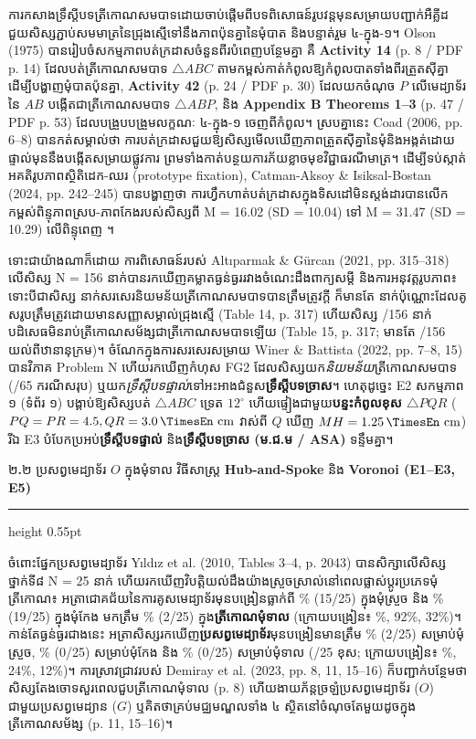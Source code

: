 \documentclass[a4paper,12pt]{article}
\newcommand{\en}[1]{{\TimesEn #1}}
\newcommand{\enbf}[1]{{\TimesEn\textbf{#1}}}
\newcommand{\unit}[1]{\,\text{\en{#1}}}
\newcommand{\tri}[1]{\ensuremath{\triangle #1}}
\newcommand{\subsectitle}[1]{{\muol\fontsize{11pt}{14.5pt}\selectfont #1}}
\newcommand{\subsec}[1]{%
  \Needspace{1.6cm}%
  \vspace{3pt}%
  \subsectitle{#1}\par%
  \vspace{-2pt}%
  {\color{black}\hrule height 0.55pt}%
  \vspace{3pt}%
}
\begin{document}
ការកសាងទ្រឹស្ដីបទត្រីកោណសមបាទដោយចាប់ផ្ដើមពីបទពិសោធន៍រូបវន្តមុនសម្រាយបញ្ជាក់អឺគ្លីដ ជួយសិស្សភ្ជាប់សមមាត្រនៃជ្រុងស្មើទៅនឹងភាពប៉ុនគ្នានៃមុំបាត និងបន្ទាត់រួម ៤-ក្នុង-១។ \en{Olson (1975)} បានរៀបចំសកម្មភាពបត់ក្រដាសចំនួនពីរបំពេញបន្ថែមគ្នា គឺ \textbf{\en{Activity 14}} (\en{p. 8 / PDF p. 14}) ដែលបត់ត្រីកោណសមបាទ $\tri{ABC}$ តាមកម្ពស់កាត់កំពូលឱ្យកំពូលបាតទាំងពីរត្រួតស៊ីគ្នាដើម្បីបង្ហាញមុំបាតប៉ុនគ្នា, \textbf{\en{Activity 42}} (\en{p. 24 / PDF p. 30}) ដែលយកចំណុច $P$ លើមេដ្យាទ័រនៃ $AB$ បង្កើតជាត្រីកោណសមបាទ $\tri{ABP}$, និង \textbf{\en{Appendix B Theorems 1--3}} (\en{p. 47 / PDF p. 53}) ដែលបង្រួបបង្រួមលក្ខណៈ ៤-ក្នុង-១ ចេញពីកំពូល។ ស្របគ្នានេះ \en{Coad (2006, pp. 6--8)} បានកត់សម្គាល់ថា ការបត់ក្រដាសជួយឱ្យសិស្សមើលឃើញភាពត្រួតស៊ីគ្នានៃមុំនិងអង្កត់ដោយផ្ទាល់មុននឹងបង្កើតសម្រាយផ្លូវការ ព្រមទាំងកាត់បន្ថយការភ័យខ្លាចមុខវិជ្ជាធរណីមាត្រ។ ដើម្បីទប់ស្កាត់អគតិរូបភាពស្ថិតិដេក-ឈរ (\en{prototype fixation}), \en{Catman-Aksoy \& Isiksal-Bostan (2024, pp. 242--245)} បានបង្ហាញថា ការហ្វឹកហាត់បត់ក្រដាសក្នុងទិសដៅមិនស្ដង់ដារបានលើកកម្ពស់ពិន្ទុភាពស្រប-ភាពកែងរបស់សិស្សពី \en{M = 16.02 (SD = 10.04)} ទៅ \en{M = 31.47 (SD = 10.29)} លើពិន្ទុពេញ \en{54}។

ទោះជាយ៉ាងណាក៏ដោយ ការពិសោធន៍របស់ \en{Altıparmak \& Gürcan (2021, pp. 315--318)} លើសិស្ស \en{N = 156} នាក់បានរកឃើញគម្លាតធ្ងន់ធ្ងររវាងចំណេះដឹងពាក្យសម្ដី និងការអនុវត្តរូបភាព៖ ទោះបីជាសិស្ស \en{56} នាក់សរសេរនិយមន័យត្រីកោណសមបាទបានត្រឹមត្រូវក្ដី ក៏មានតែ \en{23} នាក់ប៉ុណ្ណោះដែលគូសរូបត្រឹមត្រូវដោយមានសញ្ញាសម្គាល់ជ្រុងស្មើ (\en{Table 14, p. 317}) ហើយសិស្ស \en{151/156} នាក់បដិសេធមិនរាប់ត្រីកោណសម័ង្សជាត្រីកោណសមបាទឡើយ (\en{Table 15, p. 317}; មានតែ \en{5/156} យល់ពីឋានានុក្រម)។ ចំណែកក្នុងការសរសេរសម្រាយ \en{Winer \& Battista (2022, pp. 7--8, 15)} បានវិភាគ \en{Problem N} ហើយរកឃើញកំហុស \en{FG2} ដែលសិស្សយក\emph{និយមន័យ}ត្រីកោណសមបាទ (\en{27/65} ករណីសរុប) ឬយក\emph{ទ្រឹស្ដីបទផ្ទាល់}ទៅអះអាងជំនួស\textbf{ទ្រឹស្ដីបទច្រាស}។ ហេតុដូច្នេះ \en{E2} សកម្មភាព ១ (ទំព័រ ១) បង្គាប់ឱ្យសិស្សបត់ $\tri{ABC}$ ទ្រេត $12^\circ$ ហើយផ្ទៀងជាមួយ\textbf{បន្ទះកំពូលខុស $\tri{PQR}$} ($PQ=PR=4.5, QR=3.0\unit{cm}$ វាស់ពី $Q$ ឃើញ $MH=1.25\unit{cm}$) រីឯ \en{E3} បំបែកប្រអប់\textbf{ទ្រឹស្ដីបទផ្ទាល់} និង\textbf{ទ្រឹស្ដីបទច្រាស (\textbf{ម.ជ.ម / ASA})} ទន្ទឹមគ្នា។

\subsec{២\enbf{.}២ ប្រសព្វមេដ្យាទ័រ $O$ ក្នុងមុំទាល វិធីសាស្ត្រ \enbf{Hub-and-Spoke} និង \enbf{Voronoi (E1--E3, E5)}}

ចំពោះផ្នែកប្រសព្វមេដ្យាទ័រ \en{Yıldız et al. (2010, Tables 3--4, p. 2043)} បានសិក្សាលើសិស្សថ្នាក់ទី៨ \en{N = 25} នាក់ ហើយរកឃើញវិបត្តិយល់ដឹងយ៉ាងស្រួចស្រាល់នៅពេលផ្លាស់ប្ដូរប្រភេទមុំត្រីកោណ៖ អត្រាជោគជ័យនៃការគូសមេដ្យាទ័រមុនបង្រៀនធ្លាក់ពី \en{60\% (15/25)} ក្នុងមុំស្រួច និង \en{76\% (19/25)} ក្នុងមុំកែង មកត្រឹម \en{8\% (2/25)} ក្នុង\textbf{ត្រីកោណមុំទាល} (ក្រោយបង្រៀន៖ \en{68\%, 92\%, 32\%})។ កាន់តែធ្ងន់ធ្ងរជាងនេះ អត្រាសិស្សរកឃើញ\textbf{ប្រសព្វមេដ្យាទ័រ}មុនបង្រៀនមានត្រឹម \en{8\% (2/25)} សម្រាប់មុំស្រួច, \en{0\% (0/25)} សម្រាប់មុំកែង និង \en{0\% (0/25)} សម្រាប់មុំទាល (\en{25/25} ខុស; ក្រោយបង្រៀន៖ \en{16\%, 24\%, 12\%})។ ការស្រាវជ្រាវរបស់ \en{Demiray et al. (2023, pp. 8, 11, 15--16)} ក៏បញ្ជាក់បន្ថែមថា សិស្សតែងចោទសួរពេលជួបត្រីកោណមុំទាល (\en{p. 8}) ហើយងាយភ័ន្តច្រឡំប្រសព្វមេដ្យាទ័រ ($O$) ជាមួយប្រសព្វមេដ្យាន ($G$) ឬគិតថាគ្រប់មជ្ឈមណ្ឌលទាំង ៤ ស្ថិតនៅចំណុចតែមួយដូចក្នុងត្រីកោណសម័ង្ស (\en{p. 11, 15--16})។
\end{document}
